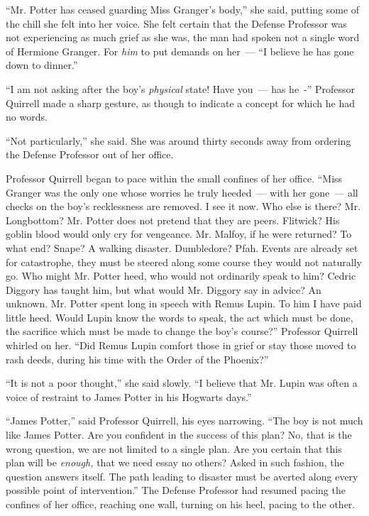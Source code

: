 ``Mr. Potter has ceased guarding Miss Granger's body,'' she said, putting some of the chill she felt into her voice. She felt certain that the Defense Professor was not experiencing as much grief as she was, the man had spoken not a single word of Hermione Granger. For \emph{him} to put demands on her~--- ``I believe he has gone down to dinner.''

``I am not asking after the boy's \emph{physical} state! Have you~--- has he~-'' Professor Quirrell made a sharp gesture, as though to indicate a concept for which he had no words.

``Not particularly,'' she said. She was around thirty seconds away from ordering the Defense Professor out of her office.

Professor Quirrell began to pace within the small confines of her office. ``Miss Granger was the only one whose worries he truly heeded~--- with her gone~--- all checks on the boy's recklessness are removed. I see it now. Who else is there? Mr. Longbottom? Mr. Potter does not pretend that they are peers. Flitwick? His goblin blood would only cry for vengeance. Mr. Malfoy, if he were returned? To what end? Snape? A walking disaster. Dumbledore? Pfah. Events are already set for catastrophe, they must be steered along some course they would not naturally go. Who might Mr. Potter heed, who would not ordinarily speak to him? Cedric Diggory has taught him, but what would Mr. Diggory say in advice? An unknown. Mr. Potter spent long in speech with Remus Lupin. To him I have paid little heed. Would Lupin know the words to speak, the act which must be done, the sacrifice which must be made to change the boy's course?'' Professor Quirrell whirled on her. ``Did Remus Lupin comfort those in grief or stay those moved to rash deeds, during his time with the Order of the Phoenix?''

``It is not a poor thought,'' she said slowly. ``I believe that Mr. Lupin was often a voice of restraint to James Potter in his Hogwarts days.''

``James Potter,'' said Professor Quirrell, his eyes narrowing. ``The boy is not much like James Potter. Are you confident in the success of this plan? No, that is the wrong question, we are not limited to a single plan. Are you certain that this plan will be \emph{enough,} that we need essay no others? Asked in such fashion, the question answers itself. The path leading to disaster must be averted along every possible point of intervention.'' The Defense Professor had resumed pacing the confines of her office, reaching one wall, turning on his heel, pacing to the other.

